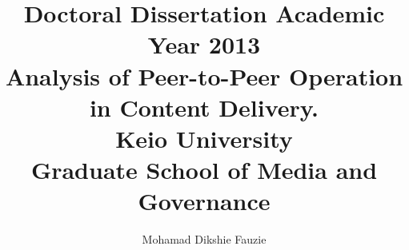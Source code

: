 \title{Doctoral Dissertation Academic Year 2013\\
\vspace{5cm}
Analysis of Peer-to-Peer Operation in Content Delivery. \\
\vspace{5cm}
Keio University \\
Graduate School of Media and Governance}
\author{Mohamad Dikshie Fauzie}
\date{}
\maketitle
